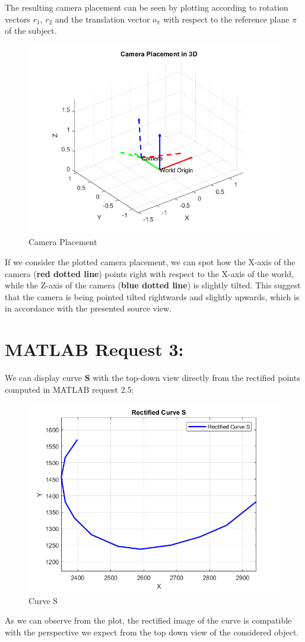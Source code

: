 \documentclass{Configuration_Files/PoliMi3i_thesis}
\begin{document}
The resulting camera placement can be seen by plotting according to rotation vectors \(r_{1}\), \(r_{2}\) and the translation vector \(o_{\pi}\) with respect to the reference plane \(\pi\) of the subject.
\begin{figure}[H]
    \centering
    \includegraphics[width=0.5\linewidth]{Project Template/Images/cam.png}
    \caption{Camera Placement}
    \label{fig:enter-label}
\end{figure}
If we consider the plotted camera placement, we can spot how the X-axis of the camera (\textbf{red dotted line}) points right with respect to the X-axis of the world, while the Z-axis of the camera (\textbf{blue dotted line}) is slightly tilted. This suggest that the camera is being pointed tilted rightwards and slightly upwards, which is in accordance with the presented source view.

\newpage
\section{MATLAB Request 3: }
We can display curve \textbf{S} with the top-down view directly from the rectified points computed in MATLAB request 2.5:
\begin{figure}[H]
    \centering
    \includegraphics[width=0.5\linewidth]{Project Template/Images/s.png}
    \caption{Curve S}
    \label{fig:enter-label}
\end{figure}
As we can observe from the plot, the rectified image of the curve is compatible with the perspective we expect from the top down view of the considered object.
\end{document}
